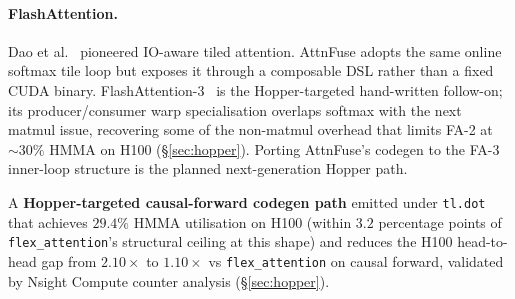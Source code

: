 \paragraph{FlashAttention.}
Dao et al.~\cite{dao2022flashattention,dao2023flashattention2}
pioneered IO-aware tiled attention. AttnFuse adopts the same online
softmax tile loop but exposes it through a composable DSL rather than
a fixed CUDA binary. FlashAttention-3~\cite{shah2024flashattention3} is
the Hopper-targeted hand-written follow-on; its producer/consumer warp
specialisation overlaps softmax with the next matmul issue, recovering
some of the non-matmul overhead that limits FA-2 at $\sim 30\%$ HMMA
on H100 (\S\ref{sec:hopper}). Porting AttnFuse's codegen to the FA-3
inner-loop structure is the planned next-generation Hopper path.




  \item A \textbf{Hopper-targeted causal-forward codegen path}
        emitted under \texttt{tl.dot} that achieves $29.4\%$ HMMA
        utilisation on H100 (within $3.2$ percentage points of
        \texttt{flex\_attention}'s structural ceiling at this shape)
        and reduces the H100 head-to-head gap from $2.10\times$ to
        $1.10\times$ vs \texttt{flex\_attention} on causal forward,
        validated by Nsight Compute counter analysis
        (\S\ref{sec:hopper}).





%
%

